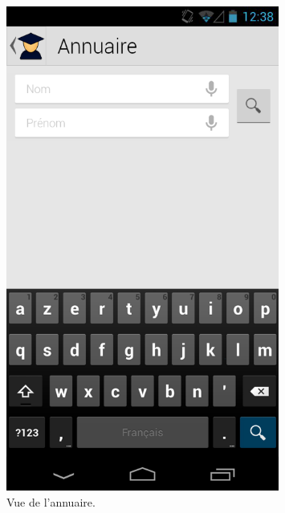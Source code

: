 \documentclass [pdftex,12pt] {report}
\begin{document}
\begin{figure}
  \begin{minipage}[t]{8cm}
    \centering
    \includegraphics[width=0.8\textwidth]{resources/ui_preview/07}
    \caption{Vue de l'annuaire.}
    \label{fig:07}
  \end{minipage}
  \hspace{+20pt}
  \begin{minipage}[t]{8cm}
    \centering

\end{minipage}
\end{figure}
\end{document}
